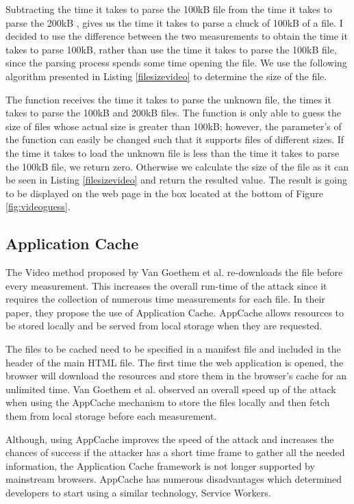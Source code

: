 \documentclass[10pt,a4paper,twoside]{book}
\begin{document}
Subtracting the time it takes to parse the 100kB file  from the time it takes to parse the 200kB , gives us the time it takes to parse a chuck of 100kB of a file. I decided to use the difference between the two measurements to obtain the time it takes to parse 100kB, rather than use the time it takes to parse the 100kB file, since the parsing process spends some time opening the file. We use the following algorithm presented in Listing \ref{filesizevideo} to determine the size of the file.

The function receives the time it takes to parse the unknown file, the times it takes to parse the 100kB and 200kB files. The function is only able to guess the size of files whose actual size is greater than 100kB; however, the parameter's of the function can easily be changed such that it supports files of different sizes. If the time it takes to load the unknown file is less than the time it takes to parse the 100kB file, we return zero. Otherwise we calculate the size of the file as it can be seen in Listing \ref{filesizevideo} and return the resulted value. The result is going to be displayed on the web page in the box located at the bottom of Figure \ref{fig:videoguess}.

\subsection{Application Cache}

The Video method proposed by Van Goethem et al. \cite{van2015clock} re-downloads the file before every measurement. This increases the overall run-time of the attack since it requires the collection of numerous time measurements for each file. In their paper, they propose the use of Application Cache. AppCache allows resources to be stored locally and be served from local storage when they are requested. 

The files to be cached need to be specified in a manifest file and included in the header of the main HTML file. The first time the web application is opened, the browser will download the resources and store them in the browser's cache for an unlimited time. Van Goethem et al. \cite{van2015clock} observed an overall speed up of the attack when using the AppCache mechanism to store the files locally and then fetch them from local storage before each measurement.

Although, using AppCache improves the speed of the attack and increases the chances of success if the attacker has a short time frame to gather all the needed information, the Application Cache framework is not longer supported by mainstream browsers. AppCache has numerous disadvantages which determined developers to start using a similar technology, Service Workers.
\end{document}
